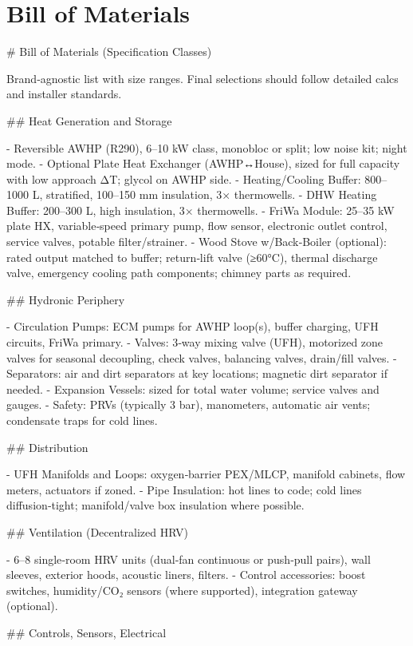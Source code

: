 \documentclass[11pt,oneside]{report}
\begin{document}
\chapter{Bill of Materials}
\begin{markdown}
# Bill of Materials (Specification Classes)

Brand‑agnostic list with size ranges. Final selections should follow detailed calcs and installer standards.

## Heat Generation and Storage

- Reversible AWHP (R290), 6–10 kW class, monobloc or split; low noise kit; night mode.
- Optional Plate Heat Exchanger (AWHP↔House), sized for full capacity with low approach ΔT; glycol on AWHP side.
- Heating/Cooling Buffer: 800–1000 L, stratified, 100–150 mm insulation, 3× thermowells.
- DHW Heating Buffer: 200–300 L, high insulation, 3× thermowells.
- FriWa Module: 25–35 kW plate HX, variable‑speed primary pump, flow sensor, electronic outlet control, service valves, potable filter/strainer.
- Wood Stove w/Back‑Boiler (optional): rated output matched to buffer; return‑lift valve (≥60°C), thermal discharge valve, emergency cooling path components; chimney parts as required.

## Hydronic Periphery

- Circulation Pumps: ECM pumps for AWHP loop(s), buffer charging, UFH circuits, FriWa primary.
- Valves: 3‑way mixing valve (UFH), motorized zone valves for seasonal decoupling, check valves, balancing valves, drain/fill valves.
- Separators: air and dirt separators at key locations; magnetic dirt separator if needed.
- Expansion Vessels: sized for total water volume; service valves and gauges.
- Safety: PRVs (typically 3 bar), manometers, automatic air vents; condensate traps for cold lines.

## Distribution

- UFH Manifolds and Loops: oxygen‑barrier PEX/MLCP, manifold cabinets, flow meters, actuators if zoned.
- Pipe Insulation: hot lines to code; cold lines diffusion‑tight; manifold/valve box insulation where possible.

## Ventilation (Decentralized HRV)

- 6–8 single‑room HRV units (dual‑fan continuous or push‑pull pairs), wall sleeves, exterior hoods, acoustic liners, filters.
- Control accessories: boost switches, humidity/CO₂ sensors (where supported), integration gateway (optional).

## Controls, Sensors, Electrical


\end{markdown}
\end{document}
